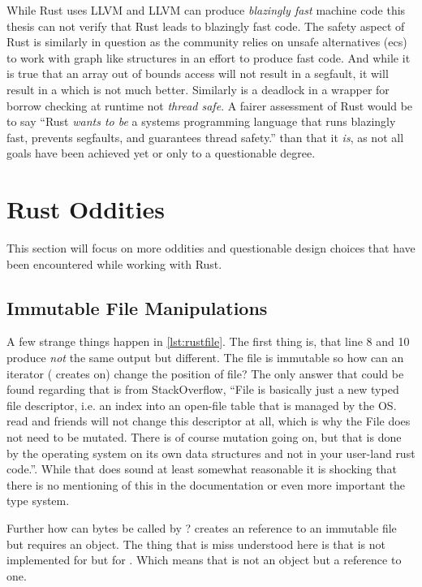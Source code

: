 \documentclass[thesis]{subfiles}
\begin{document}
  While Rust uses LLVM and LLVM can produce \emph{blazingly fast} machine code this thesis can not verify that Rust leads to blazingly fast code.
  The safety aspect of Rust is similarly in question as the community relies on unsafe alternatives (\gls{ecs}) to work with graph like structures in an effort to produce fast code.
  And while it is true that an array out of bounds access will not result in a segfault, it will result in a  which is not much better.
  Similarly is a deadlock in a wrapper for borrow checking at runtime not \emph{thread safe}.
  A fairer assessment of Rust would be to say \enquote{Rust \emph{wants to be} a systems programming language that runs blazingly fast, prevents segfaults, and guarantees thread safety.} than that it \emph{is}, as not all goals have been achieved yet or only to a questionable degree.

\section{Rust Oddities}
  This section will focus on more oddities and questionable design choices that have been encountered while working with Rust.

  \subsection{Immutable File Manipulations}
    A few strange things happen in \autoref{lst:rustfile}.
    The first thing is, that line 8 and 10 produce \emph{not} the same output but different.
    The file is immutable so how can an iterator ( creates on) change the position of file?
    The only answer that could be found regarding that is from StackOverflow, \enquote{File is basically just a new typed file descriptor, i.e. an index into an open-file table that is managed by the OS. read and friends will not change this descriptor at all, which is why the File does not need to be mutated. There is of course mutation going on, but that is done by the operating system on its own data structures and not in your user-land rust code.}\autocite{so-rust-file}.
    While that does sound at least somewhat reasonable it is shocking that there is no mentioning of this in the documentation or even more important the type system.

    Further how can bytes be called by ?
     creates an reference to an immutable file but  requires an object.
    The thing that is miss understood here is that \trait \Read is not implemented for \File but for .
    Which means that \self is not an object but a reference to one.
\end{document}
